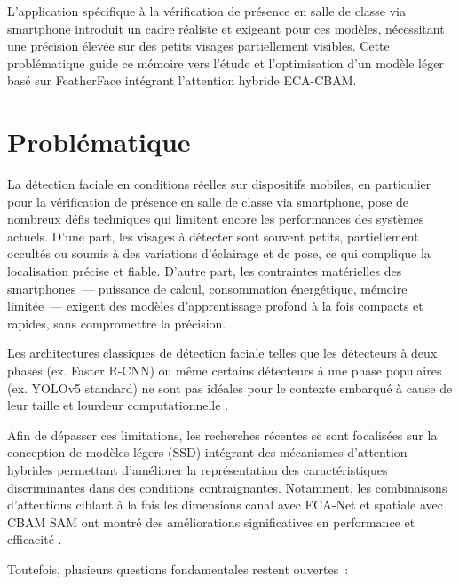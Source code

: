 \begin{onehalfspace}
\hspace{0.65 cm}L'application spécifique à la vérification de présence en salle de classe via smartphone introduit un cadre réaliste et exigeant pour ces modèles, nécessitant une précision élevée sur des petits visages partiellement visibles. Cette problématique guide ce mémoire vers l'étude et l'optimisation d'un modèle léger basé sur FeatherFace intégrant l'attention hybride ECA-CBAM.

\section{Problématique}

\hspace{0.65 cm}La détection faciale en conditions réelles sur dispositifs mobiles, en particulier pour la vérification de présence en salle de classe via smartphone, pose de nombreux défis techniques qui limitent encore les performances des systèmes actuels. D'une part, les visages à détecter sont souvent petits, partiellement occultés ou soumis à des variations d'éclairage et de pose, ce qui complique la localisation précise et fiable. D'autre part, les contraintes matérielles des smartphones~— puissance de calcul, consommation énergétique, mémoire limitée~— exigent des modèles d'apprentissage profond à la fois compacts et rapides, sans compromettre la précision.

\hspace{0.65 cm}Les architectures classiques de détection faciale telles que les détecteurs à deux phases (ex. Faster R-CNN) ou même certains détecteurs à une phase populaires (ex. YOLOv5 standard) ne sont pas idéales pour le contexte embarqué à cause de leur taille et lourdeur computationnelle \cite{Zhang2019BlazeFace}.

\hspace{0.65 cm}Afin de dépasser ces limitations, les recherches récentes se sont focalisées sur la conception de modèles légers (SSD) intégrant des mécanismes d'attention hybrides permettant d'améliorer la représentation des caractéristiques discriminantes dans des conditions contraignantes. Notamment, les combinaisons d'attentions ciblant à la fois les dimensions canal avec ECA-Net \cite{Wang2020ECANet} et spatiale avec CBAM SAM \cite{Woo2018CBAM} ont montré des améliorations significatives en performance et efficacité \cite{Wang2024ECACBAM, Kim2025FeatherFace}.

\hspace{0.65 cm}Toutefois, plusieurs questions fondamentales restent ouvertes~:


\end{onehalfspace}
